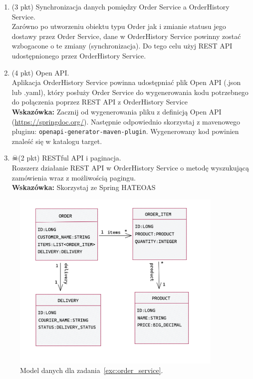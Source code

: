 \documentclass[12pt]{article}
\begin{document}
\begin{enumerate}
        \item\label{exc:cqrs_sync}
            (3 pkt) Synchronizacja danych pomiędzy Order Service a OrderHistory Service.\\
            Zarówno po utworzeniu obiektu typu Order jak i zmianie statusu jego dostawy przez Order Service, dane w OrderHistory Service powinny zostać wzbogacone o te zmiany (synchronizacja). 
            Do tego celu użyj REST API udostępnionego przez OrderHistory Service.
        \item\label{exc:openapi}
            (4 pkt) Open API.\\
            Aplikacja OrderHistory Service powinna udostępniać plik Open API (.json lub .yaml), który posłuży Order Service do wygenerowania kodu potrzebnego do połączenia poprzez REST API z OrderHistory Service\\
            \textbf{Wskazówka:} Zacznij od wygenerowania pliku z definicją Open API (\url{https://springdoc.org/}). Następnie odpowiednio skorzystaj z mavenowego pluginu: \texttt{openapi-generator-maven-plugin}. Wygenerowany kod powinien znaleść się w katalogu target.
        \item\label{exc:openapi}
        $\skull$(2 pkt) RESTful API i paginacja.\\
            Rozszerz działanie REST API w OrderHistory Service o metodę wyszukującą zamówienia wraz z możliwością pagingu.\\ 
            \textbf{Wskazówka:} Skorzystaj ze Spring HATEOAS
    \end{enumerate}
    \begin{figure}[p]
        \centering
        \includegraphics[width=0.9\textwidth]{cud_model.png}
        \caption{Model danych dla zadania~\ref{exc:order_service}.}
        \label{fig:cud-model}
    \end{figure}  
\end{document}
